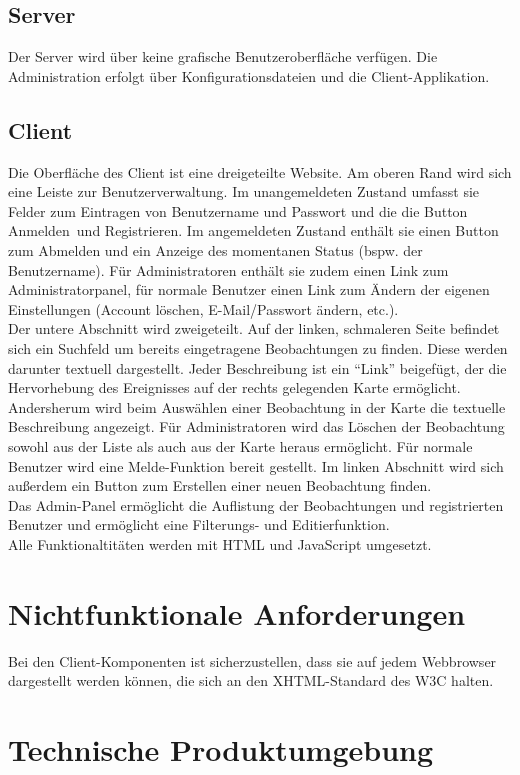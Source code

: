 \documentclass[a4paper,11pt]{scrartcl}
\begin{document}
	\subsection{Server}
		Der Server wird über keine grafische Benutzeroberfläche verfügen. Die Administration erfolgt über Konfigurationsdateien und die Client-Applikation.
	\subsection{Client}
		Die Oberfläche des Client ist eine dreigeteilte Website. Am oberen Rand wird sich eine Leiste zur Benutzerverwaltung. Im unangemeldeten Zustand umfasst sie Felder zum Eintragen von Benutzername und Passwort und die die Button \glqq Anmelden\grqq\ und \glqq Registrieren\grqq . Im angemeldeten Zustand enthält sie einen Button zum Abmelden und ein Anzeige des momentanen Status (bspw. der Benutzername). Für Administratoren enthält sie zudem einen Link zum Administratorpanel, für normale Benutzer einen Link zum Ändern der eigenen Einstellungen (Account löschen, E-Mail/Passwort ändern, etc.).\\
		Der untere Abschnitt wird zweigeteilt. Auf der linken, schmaleren Seite befindet sich ein Suchfeld um bereits eingetragene Beobachtungen zu finden. Diese werden darunter textuell dargestellt. Jeder Beschreibung ist ein “Link” beigefügt, der die Hervorhebung des Ereignisses auf der rechts gelegenden Karte ermöglicht. Andersherum wird beim Auswählen einer Beobachtung in der Karte die textuelle Beschreibung angezeigt. Für Administratoren wird das Löschen der Beobachtung sowohl aus der Liste als auch aus der Karte heraus ermöglicht. Für normale Benutzer wird eine Melde-Funktion bereit gestellt. Im linken Abschnitt wird sich außerdem ein Button zum Erstellen einer neuen Beobachtung finden.\\
		Das Admin-Panel ermöglicht die Auflistung der Beobachtungen und registrierten Benutzer und ermöglicht eine Filterungs- und Editierfunktion.\\
		Alle Funktionaltitäten werden mit HTML und JavaScript umgesetzt.
		
\section{Nichtfunktionale Anforderungen}
	Bei den Client-Komponenten ist sicherzustellen, dass sie auf jedem Webbrowser dargestellt werden können, die sich an den XHTML-Standard des W3C halten.
\section{Technische Produktumgebung}
\end{document}
